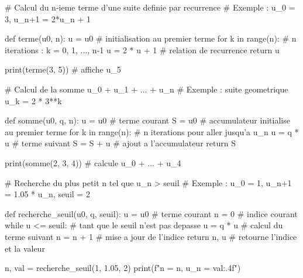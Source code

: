 


\begin{python}
# Calcul du n-ieme terme d'une suite definie par recurrence
# Exemple : u_0 = 3, u_{n+1} = 2*u_n + 1

def terme(u0, n):
    u = u0          # initialisation au premier terme
    for k in range(n):   # n iterations : k = 0, 1, ..., n-1
        u = 2 * u + 1    # relation de recurrence
    return u

print(terme(3, 5))  # affiche u_5
\end{python}


\begin{python}
# Calcul de la somme u_0 + u_1 + ... + u_n
# Exemple : suite geometrique u_k = 2 * 3**k

def somme(u0, q, n):
    u = u0      # terme courant
    S = u0      # accumulateur initialise au premier terme
    for k in range(n):   # n iterations pour aller jusqu'a u_n
        u = q * u        # terme suivant
        S = S + u        # ajout a l'accumulateur
    return S

print(somme(2, 3, 4))  # calcule u_0 + ... + u_4
\end{python}


\begin{python}
# Recherche du plus petit n tel que u_n > seuil
# Exemple : u_0 = 1, u_{n+1} = 1.05 * u_n, seuil = 2

def recherche_seuil(u0, q, seuil):
    u = u0      # terme courant
    n = 0       # indice courant
    while u <= seuil:    # tant que le seuil n'est pas depasse
        u = q * u        # calcul du terme suivant
        n = n + 1        # mise a jour de l'indice
    return n, u          # retourne l'indice et la valeur

n, val = recherche_seuil(1, 1.05, 2)
print(f"n = {n}, u_n = {val:.4f}")
\end{python}

